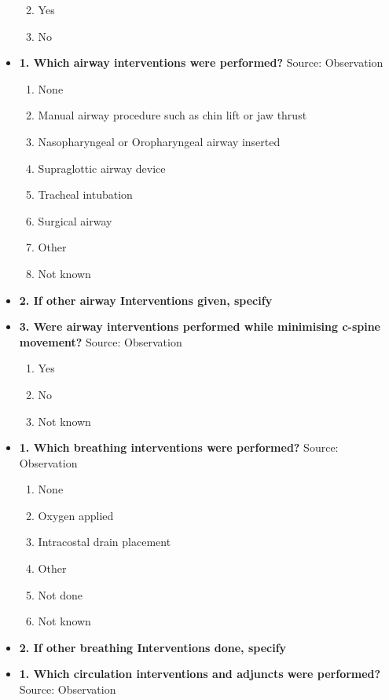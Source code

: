 \documentclass[
]{scrartcl}
\providecommand{\tightlist}{%
  \setlength{\itemsep}{0pt}\setlength{\parskip}{0pt}}\usepackage{longtable,booktabs,array}
\begin{document}
\begin{itemize}
  \begin{enumerate}
  \def\labelenumi{\arabic{enumi}.}
  \tightlist
  \item
    Yes
  \item
    No
  \end{enumerate}
\item
  \textbf{1. Which airway interventions were performed?} Source:
  Observation

  \begin{enumerate}
  \def\labelenumi{\arabic{enumi}.}
  \tightlist
  \item
    None
  \item
    Manual airway procedure such as chin lift or jaw thrust
  \item
    Nasopharyngeal or Oropharyngeal airway inserted
  \item
    Supraglottic airway device
  \item
    Tracheal intubation
  \item
    Surgical airway
  \item
    Other
  \item
    Not known
  \end{enumerate}
\item
  \textbf{2. If other airway Interventions given, specify}
\item
  \textbf{3. Were airway interventions performed while minimising
  c-spine movement?} Source: Observation

  \begin{enumerate}
  \def\labelenumi{\arabic{enumi}.}
  \tightlist
  \item
    Yes
  \item
    No
  \item
    Not known
  \end{enumerate}
\item
  \textbf{1. Which breathing interventions were performed?} Source:
  Observation

  \begin{enumerate}
  \def\labelenumi{\arabic{enumi}.}
  \tightlist
  \item
    None
  \item
    Oxygen applied
  \item
    Intracostal drain placement
  \item
    Other
  \item
    Not done
  \item
    Not known
  \end{enumerate}
\item
  \textbf{2. If other breathing Interventions done, specify}
\item
  \textbf{1. Which circulation interventions and adjuncts were
  performed?} Source: Observation


\end{itemize}
\end{document}

